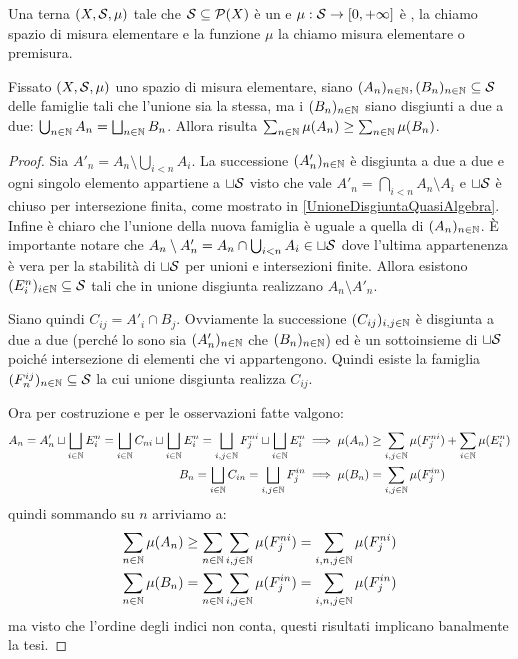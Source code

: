 \begin{definition}
	Una terna $(X,\S,\mu)$ tale che $\S\subseteq\mathcal P(X)$ è un \semiring{} e $\mu:\S\to \Rpiu$ è \sigadd{}, la chiamo spazio di misura elementare e la funzione $\mu$ la chiamo misura elementare o premisura.
\end{definition}

\begin{lemma}\label{CoerenzaPremisura}
	Fissato $(X,\S,\mu)$ uno spazio di misura elementare, siano $(A_n)_{n\in\N},(B_n)_{n\in\N}\subseteq\S$ delle famiglie tali che l'unione sia la stessa, ma i $(B_n)_{n\in\N}$ siano disgiunti a due a due: $\bigcup_{n\in\N}A_n=\bigsqcup_{n\in\N}B_n$.
	Allora risulta $\sum_{n\in\N}\mu(A_n)\ge \sum_{n\in\N}\mu(B_n)$.
\end{lemma}
\begin{proof}
	Sia $A'_n=A_n\setminus\bigcup_{i<n}A_i$. La successione $(A'_n)_{n\in\N}$ è disgiunta a due a due e ogni singolo elemento appartiene a $\sqcup \S$ visto che vale $A'_n=\bigcap_{i<n}A_n\setminus A_i$ e $\sqcup \S$ è chiuso per intersezione finita, come mostrato in \cref{UnioneDisgiuntaQuasiAlgebra}. Infine è chiaro che l'unione della nuova famiglia è uguale a quella di $(A_n)_{n\in\N}$.
	È importante notare che $A_n\setminus A'_n=A_n\cap\bigcup_{i<n}A_i\in\sqcup\S$ dove l'ultima appartenenza è vera per la stabilità di $\sqcup\S$ per unioni e intersezioni finite. Allora esistono $(E^n_i)_{i\in\N}\subseteq\S$ tali che in unione disgiunta realizzano $A_n\setminus A'_n$.
	
	Siano quindi $C_{ij}=A'_i\cap B_j$. Ovviamente la successione $(C_{ij})_{i,j\in\N}$ è disgiunta a due a due (perché lo sono sia $(A'_n)_{n\in\N}$ che $(B_n)_{n\in\N}$) ed è un sottoinsieme di $\sqcup\S$ poiché intersezione di elementi che vi appartengono. Quindi esiste la famiglia $(F^{ij}_n)_{n\in\N}\subseteq\S$ la cui unione disgiunta realizza $C_{ij}$.
	
	Ora per costruzione e per le osservazioni fatte valgono:
	\begin{align*}
		A_n= A'_n\sqcup \bigsqcup_{i\in\N}E^n_i=\bigsqcup_{i\in\N}C_{ni}\sqcup \bigsqcup_{i\in\N}E^n_i
		=\bigsqcup_{i,j\in\N}F^{ni}_j\sqcup \bigsqcup_{i\in\N}E^n_i
		&\implies \mu(A_n)\ge\sum_{i,j\in\N}\mu(F^{ni}_j)+\sum_{i\in\N}\mu(E^n_i)\\
		B_n=\bigsqcup_{i\in\N}C_{in}=\bigsqcup_{i,j\in\N}F^{in}_j
		&\implies \mu(B_n)=\sum_{i,j\in\N}\mu(F^{in}_j)
	\end{align*}
	quindi sommando su $n$ arriviamo a:
	\begin{align*}
		\sum_{n\in\N}\mu(A_n)&\ge \sum_{n\in\N}\sum_{i,j\in\N}\mu(F^{ni}_j)
		=\sum_{i,n,j\in\N}\mu(F^{ni}_j)\\
		\sum_{n\in\N}\mu(B_n)&=\sum_{n\in\N}\sum_{i,j\in\N}\mu(F^{in}_j)=\sum_{i,n,j\in\N}\mu(F^{in}_j)
	\end{align*}
	ma visto che l'ordine degli indici non conta, questi risultati implicano banalmente la tesi.


\end{proof}



